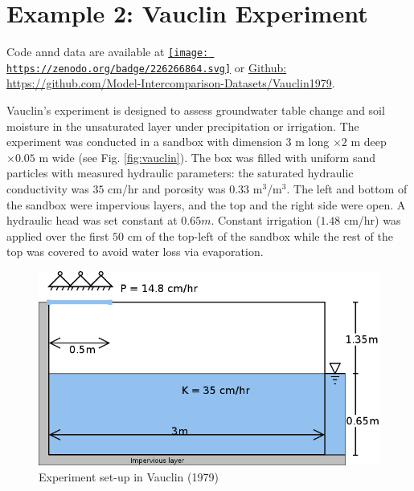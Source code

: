 \documentclass[]{scrbook}
\begin{document}
\section{Example 2: Vauclin
Experiment}\label{example-2-vauclin-experiment}

Code annd data are available at
\href{https://zenodo.org/badge/latestdoi/226266864}{\texttt{[image: https://zenodo.org/badge/226266864.svg]}}
or
\href{https://github.com/Model-Intercomparison-Datasets/Vauclin1979}{Github:
https://github.com/Model-Intercomparison-Datasets/Vauclin1979}.

Vauclin's experiment \citep{Vauclin1979} is designed to assess
groundwater table change and soil moisture in the unsaturated layer
under precipitation or irrigation. The experiment was conducted in a
sandbox with dimension \(3\) m long \(\times 2\) m deep \(\times 0.05\)
m wide (see Fig. \ref{fig:vauclin}). The box was filled with uniform
sand particles with measured hydraulic parameters: the saturated
hydraulic conductivity was \(35\) cm/hr and porosity was \(0.33\)
m\(^3\)/m\(^3\). The left and bottom of the sandbox were impervious
layers, and the top and the right side were open. A hydraulic head was
set constant at \(0.65 m\). Constant irrigation (\(1.48\) cm/hr) was
applied over the first \(50\) cm of the top-left of the sandbox while
the rest of the top was covered to avoid water loss via evaporation.

\begin{figure}
\centering
\includegraphics{Fig/Example/Vauclin/Vauclin.png}
\caption{Experiment set-up in Vauclin (1979)}
\end{figure}
\end{document}
